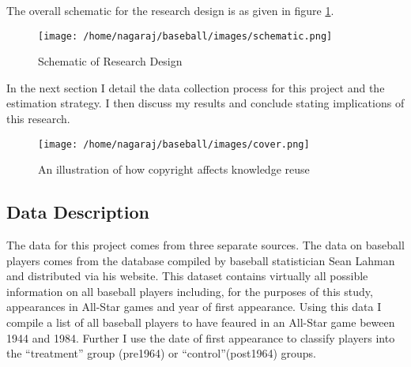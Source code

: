 \documentclass[12pt]{article}
\begin{document}
The overall schematic for the research design is as given in figure \ref{fig:schematic}. 


\begin{figure}[h]
\centering
\texttt{[image: /home/nagaraj/baseball/images/schematic.png]}
\caption{Schematic of Research Design}
\label{fig:schematic}
\end{figure}

In the next section I detail the data collection process for this project and the estimation strategy. I then discuss my results and conclude stating implications of this research. 

\begin{figure}[h]
\centering
\texttt{[image: /home/nagaraj/baseball/images/cover.png]}
\caption{An illustration of how copyright affects knowledge reuse}
\end{figure}

\subsection{Data Description}

The data for this project comes from three separate sources. The data on baseball players comes from the database compiled by baseball statistician Sean Lahman and distributed via his website. This dataset contains virtually all possible information on all baseball players including, for the purposes of this study, appearances in All-Star games and year of first appearance. Using this data I compile a list of all baseball players to have feaured in an All-Star game beween 1944 and 1984. Further I use the date of first appearance to classify players into the ``treatment'' group (pre1964) or ``control''(post1964) groups. 
\end{document}
